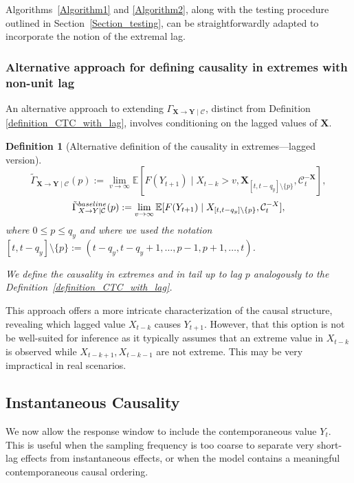 \documentclass[a4paper,11pt]{article}
\newtheorem{definition}{Definition}
\newcommand{\baseline}{{\rm baseline}}
\begin{document}
Algorithms~\ref{Algorithm1} and \ref{Algorithm2}, along with the testing procedure outlined in Section~\ref{Section_testing}, can be straightforwardly adapted to incorporate the notion of the extremal lag.

\subsubsection{Alternative approach for defining causality in extremes with non-unit lag}

An alternative approach to extending $\Gamma_{\textbf{X}\to\textbf{Y}\mid\mathcal{C}}$, distinct from Definition \ref{definition_CTC_with_lag}, involves conditioning on the lagged values of $\textbf{X}$. 

\begin{definition}[Alternative definition of the causality in extremes---lagged version]\label{definition_CTC_with_lag_alternative}
    $$  \tilde{\Gamma}_{\textbf{X}\to\textbf{Y}\mid\mathcal{C}}(p) :=  \lim_{v\to\infty} \mathbb{E}[F(Y_{t+1})\mid X_{t-k}>v, \textbf{X}_{[t, t-q_y]\setminus\{p\}}, \mathcal{C}^{-\textbf{X}}_t],$$
      $$  \tilde{\Gamma}^{\baseline}_{\textbf{X}\to\textbf{Y}\mid\mathcal{C}}(p) :=  \lim_{v\to\infty} \mathbb{E}[F(Y_{t+1})\mid  \textbf{X}_{[t, t-q_y]\setminus\{p\}}, \mathcal{C}^{-\textbf{X}}_t],$$
where $0\leq p\leq q_y$ and where we used the notation $[t, t-q_y]\setminus\{p\} := (t-q_y, t-q_y+1, \dots, p-1, p+1, \dots, t)$. 

We define the causality in extremes and in tail up to lag $p$ analogously to the Definition~\ref{definition_CTC_with_lag}. 
\end{definition}
This approach offers a more intricate characterization of the causal structure, revealing which lagged value $X_{t-k}$ causes $Y_{t+1}$. However, that this option is not be well-suited for inference as it typically assumes that an extreme value in $X_{t-k}$ is observed while $X_{t-k+1},X_{t-k-1} $ are not extreme. This may be very impractical in real scenarios. 


\subsection{Instantaneous Causality}\label{Appendix_A_Instantaneous}

We now allow the response window to include the contemporaneous value \(Y_t\). This is useful when the sampling frequency is too coarse to separate very short-lag effects from instantaneous effects, or when the model contains a meaningful contemporaneous causal ordering.
\end{document}
